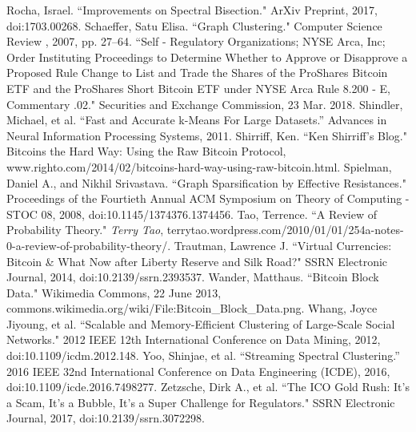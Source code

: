 \documentclass[journal]{IEEEtran}
\begin{document}
\begin{thebibliography}{1}
 Rocha, Israel. ``Improvements on Spectral Bisection." ArXiv Preprint, 2017, doi:1703.00268.
 Schaeffer, Satu Elisa. ``Graph Clustering." Computer Science Review , 2007, pp. 27–64.
 ``Self - Regulatory Organizations; NYSE Arca, Inc; Order Instituting Proceedings to Determine Whether to Approve or Disapprove a Proposed Rule Change to List and Trade the Shares of the ProShares Bitcoin ETF and the ProShares Short Bitcoin ETF under NYSE Arca Rule 8.200 - E, Commentary .02." Securities and Exchange Commission, 23 Mar. 2018.
 Shindler, Michael, et al. ``Fast and Accurate k-Means For Large Datasets.” Advances in Neural Information Processing Systems, 2011. 
 Shirriff, Ken. ``Ken Shirriff's Blog." Bitcoins the Hard Way: Using the Raw Bitcoin Protocol, www.righto.com/2014/02/bitcoins-hard-way-using-raw-bitcoin.html. 
 Spielman, Daniel A., and Nikhil Srivastava. ``Graph Sparsification by Effective Resistances." Proceedings of the Fourtieth Annual ACM Symposium on Theory of Computing - STOC 08, 2008, doi:10.1145/1374376.1374456.
 Tao, Terrence. ``A Review of Probability Theory." \textit{Terry Tao}, terrytao.wordpress.com/2010/01/01/254a-notes-0-a-review-of-probability-theory/.
 Trautman, Lawrence J. ``Virtual Currencies: Bitcoin \& What Now after Liberty Reserve and Silk Road?" SSRN Electronic Journal, 2014, doi:10.2139/ssrn.2393537.
 Wander, Matthaus. ``Bitcoin Block Data." Wikimedia Commons, 22 June 2013, commons.wikimedia.org/wiki/File:Bitcoin\_Block\_Data.png.
 Whang, Joyce Jiyoung, et al. ``Scalable and Memory-Efficient Clustering of Large-Scale Social Networks." 2012 IEEE 12th International Conference on Data Mining, 2012, doi:10.1109/icdm.2012.148.
 Yoo, Shinjae, et al. “Streaming Spectral Clustering.” 2016 IEEE 32nd International Conference on Data Engineering (ICDE), 2016, doi:10.1109/icde.2016.7498277. 
 Zetzsche, Dirk A., et al. ``The ICO Gold Rush: It's a Scam, It's a Bubble, It's a Super Challenge for Regulators." SSRN Electronic Journal, 2017, doi:10.2139/ssrn.3072298.
\end{thebibliography}
\end{document}

